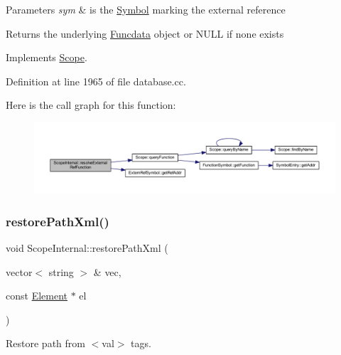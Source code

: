 \begin{DoxyParams}{Parameters}
{\em sym} & is the \mbox{\hyperlink{class_symbol}{Symbol}} marking the external reference \\
\hline
\end{DoxyParams}
\begin{DoxyReturn}{Returns}
the underlying \mbox{\hyperlink{class_funcdata}{Funcdata}} object or N\+U\+LL if none exists 
\end{DoxyReturn}


Implements \mbox{\hyperlink{class_scope_af4c45025894f1996ef0f3556752cd997}{Scope}}.



Definition at line 1965 of file database.\+cc.

Here is the call graph for this function\+:
\nopagebreak
\begin{figure}[H]
\begin{center}
\leavevmode
\includegraphics[width=350pt]{class_scope_internal_acf54c42b2ce7edfa37f9bf1223bc2840_cgraph}
\end{center}
\end{figure}
\mbox{\label{class_scope_internal_a45de50d5d7b6ab09d72cbf5861f50b3f}} 
\subsubsection{\texorpdfstring{restorePathXml()}{restorePathXml()}}
{\footnotesize\ttfamily void Scope\+Internal\+::restore\+Path\+Xml (\begin{DoxyParamCaption}\item[{vector$<$ string $>$ \&}]{vec,  }\item[{const \mbox{\hyperlink{class_element}{Element}} $\ast$}]{el }\end{DoxyParamCaption})\hspace{0.3cm}{\ttfamily [static]}}



Restore path from $<$val$>$ tags. 

